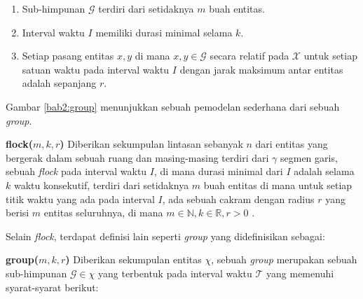 \begin{itemize}
    \begin{enumerate}
        \item Sub-himpunan $\mathcal{G}$ terdiri dari setidaknya $m$ buah entitas.
        \item Interval waktu $I$ memiliki durasi minimal selama $k$.
        \item Setiap pasang entitas $x, y$ di mana $x, y \in \mathcal{G}$ secara relatif pada $\mathcal{X}$ untuk setiap satuan waktu pada interval waktu $I$ dengan jarak maksimum antar entitas adalah sepanjang $r$.
    \end{enumerate}
    
    Gambar \ref{bab2:group} menunjukkan sebuah pemodelan sederhana dari sebuah \textit{group}.
\end{itemize}

\iffalse

\textbf{flock($m, k, r$)} Diberikan sekumpulan lintasan sebanyak $n$ dari entitas yang bergerak dalam sebuah ruang dan masing-masing terdiri dari $\gamma$ segmen garis, sebuah \textit{flock} pada interval waktu $I$, di mana durasi minimal dari $I$ adalah selama $k$ waktu konsekutif, terdiri dari setidaknya $m$ buah entitas di mana untuk setiap titik waktu yang ada pada interval $I$, ada sebuah cakram dengan radius $r$ yang berisi $m$ entitas seluruhnya, di mana $m \in \mathbb{N}, k \in \mathbb{R}, r > 0$ \cite{gudmundsson:flock}.

Selain \textit{flock}, terdapat definisi lain seperti \textit{group} yang didefinisikan sebagai:

\textbf{group($m, k, r$)} Diberikan sekumpulan entitas $\chi$, sebuah \textit{group} merupakan sebuah sub-himpunan $\mathcal{G} \in \chi$ yang terbentuk pada interval waktu $\mathcal{T}$ yang memenuhi syarat-syarat berikut:

